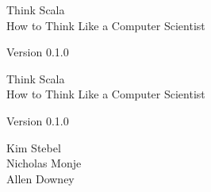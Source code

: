\documentclass[10pt]{book}
\newcommand{\theversion}{0.1.0}
\begin{document}
\frontmatter




\newtheorem{ex}{Exercise}[chapter]

\begin{latexonly}

\renewcommand{\blankpage}{\thispagestyle{empty} \quad \newpage}



\thispagestyle{empty}

\begin{flushright}
\vspace*{2.0in}

\begin{spacing}{3}
{\huge Think Scala}\\
{\Large How to Think Like a Computer Scientist}
\end{spacing}

\vspace{0.25in}

Version \theversion

\vfill

\end{flushright}


\blankpage
\blankpage

\pagebreak
\thispagestyle{empty}

\begin{flushright}
\vspace*{2.0in}

\begin{spacing}{3}
{\huge Think Scala}\\
{\Large How to Think Like a Computer Scientist}
\end{spacing}

\vspace{0.25in}

Version \theversion

\vspace{1in}


{
\large Kim Stebel\\
\large Nicholas Monje\\
\large Allen Downey\\
}



\end{flushright}
\end{latexonly}
\end{document}
